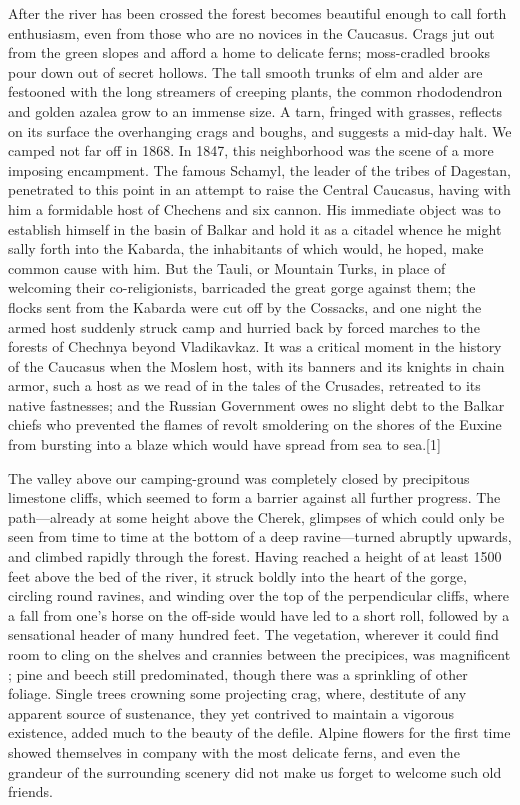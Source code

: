 \documentclass[25pt, a4paper]{article}
\begin{document}
	After the river has been crossed the forest becomes beautiful enough to call forth enthusiasm, even from those who are no novices in the Caucasus. Crags jut out from the green slopes and afford a home to delicate ferns; moss-cradled brooks pour down out of secret hollows. The tall smooth trunks of elm and alder are festooned with the long streamers of creeping plants, the common rhododendron and golden azalea grow to an immense size. A tarn, fringed with grasses, reflects on its surface the overhanging crags and boughs, and suggests a mid-day halt. We camped not far off in 1868. In 1847, this neighborhood was the scene of a more imposing encampment. The famous Schamyl, the leader of the tribes of Dagestan, penetrated to this point in an attempt to raise the Central Caucasus, having with him a formidable host of Chechens and six cannon. His immediate object was to establish himself in the basin of Balkar and hold it as a citadel whence he might sally forth into the Kabarda, the inhabitants of which would, he hoped, make common cause with him. But the Tauli, or Mountain Turks, in place of welcoming their co-religionists, barricaded the great gorge against them; the flocks sent from the Kabarda were cut off by the Cossacks, and one night the armed host suddenly struck camp and hurried back by forced marches to the forests of Chechnya beyond Vladikavkaz. It was a critical moment in the history of the Caucasus when the Moslem host, with its banners and its knights in chain armor, such a host as we read of in the tales of the Crusades, retreated to its native fastnesses; and the Russian Government owes no slight debt to the Balkar chiefs who prevented the flames of revolt smoldering on the shores of the Euxine from bursting into a blaze which would have spread from sea to sea.[1]
	
	The valley above our camping-ground was completely closed by precipitous limestone cliffs, which seemed to form a barrier against all further progress. The path—already at some height above the Cherek, glimpses of which could only be seen from time to time at the bottom of a deep ravine—turned abruptly upwards, and climbed rapidly through the forest. Having reached a height of at least 1500 feet above the bed of the river, it struck boldly into the heart of the gorge, circling round ravines, and winding over the top of the perpendicular cliffs, where a fall from one's horse on the off-side would have led to a short roll, followed by a sensational header of many hundred feet. The vegetation, wherever it could find room to cling on the shelves and crannies between the precipices, was magnificent ; pine and beech still predominated, though there was a sprinkling of other foliage. Single trees crowning some projecting crag, where, destitute of any apparent source of sustenance, they yet contrived to maintain a vigorous existence, added much to the beauty of the defile. Alpine flowers for the first time showed themselves in company with the most delicate ferns, and even the grandeur of the surrounding scenery did not make us forget to welcome such old friends.
	
\end{document}

